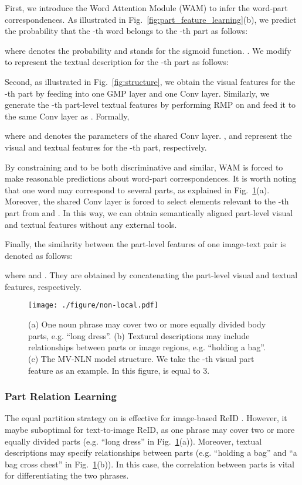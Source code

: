 \documentclass[journal]{IEEEtran}
\begin{document}
First, we introduce the Word Attention Module (WAM) to infer the word-part correspondences. As illustrated in Fig.~\ref{fig:part_feature_learning}(b), we predict the probability that the -th word belongs to the -th part as follows:

where  denotes the probability and  stands for the sigmoid function. . We modify   to represent the textual description for the -th part as follows:




Second, as illustrated in Fig.~\ref{fig:structure}, we obtain the visual features for the -th part by feeding  into one GMP layer and one  Conv layer. Similarly, we generate the -th part-level textual features by performing RMP on  and feed it to the same  Conv layer as . Formally,



where  and denotes the parameters of the shared  Conv layer. ,  and represent the visual and textual features for the -th part, respectively.

By constraining  and   to be both discriminative and similar, WAM is forced to make reasonable predictions about word-part correspondences. It is worth noting that one word may correspond to several parts, as explained in Fig.~\ref{fig:non-local}(a). Moreover, the shared  Conv layer is forced to select elements relevant to the -th part from  and . In this way, we can obtain semantically aligned part-level visual and textual features without any external tools.

Finally, the similarity between the part-level features of one image-text pair is denoted as follows:

where  and . They are obtained by concatenating the  part-level visual and textual features, respectively.

\begin{figure}[t]
\begin{center}
\texttt{[image: ./figure/non-local.pdf]}
\end{center}
   \caption{(a) One noun phrase may cover two or more equally divided body parts, e.g. ``long dress''. (b) Textural descriptions may include relationships between parts or image regions, e.g. ``holding a bag''. (c) The MV-NLN model structure. We take the -th visual part feature  as an example. In this figure,  is equal to 3.}
\label{fig:non-local}
\end{figure}

\subsubsection{Part Relation Learning}
The equal partition strategy on  is effective for image-based ReID \cite{sun2018beyond,yao2019deep}. However, it maybe suboptimal for text-to-image ReID, as one phrase may cover two or more equally divided parts (e.g. ``long dress'' in Fig.~\ref{fig:non-local}(a)). Moreover, textual descriptions may specify relationships between parts (e.g. ``holding a bag'' and ``a bag cross chest'' in Fig.~\ref{fig:non-local}(b)). In this case, the correlation between parts is vital for differentiating the two phrases.
\end{document}
